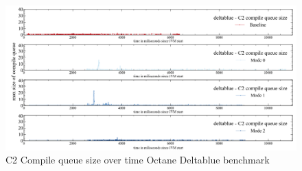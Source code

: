 \begin{figure}[ht]
  \begin{center}
    \centering
    \includegraphics[width=1.0\textwidth]{figures/octane_queue_deltablue_separate_c2.png}
    \caption{C2 Compile queue size over time Octane Deltablue benchmark}
    \label{f:octane_queue_deltablue_separate_c2}
  \end{center}
\end{figure}
\clearpage

